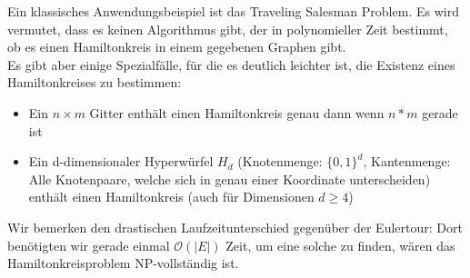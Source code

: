 \documentclass[a4paper]{report}
\begin{document}
Ein klassisches Anwendungsbeispiel ist das Traveling Salesman Problem. Es wird vermutet, dass es keinen 
Algorithmus gibt, der in polynomieller Zeit bestimmt, ob es einen Hamiltonkreis in einem gegebenen Graphen 
gibt. \\

Es gibt aber einige Spezialfälle, für die es deutlich leichter ist, die Existenz eines Hamiltonkreises 
zu bestimmen:

\begin{itemize}
    \item Ein $n \times m$ Gitter enthält einen Hamiltonkreis genau dann wenn $n * m$ gerade ist
    \item Ein d-dimensionaler Hyperwürfel $H_d$ (Knotenmenge: $\{0, 1\}^d$, Kantenmenge: Alle Knotenpaare, welche sich in genau einer Koordinate unterscheiden) enthält einen Hamiltonkreis (auch für Dimensionen $d \geq 4$)
\end{itemize}





Wir bemerken den drastischen Laufzeitunterschied gegenüber der Eulertour: Dort benötigten wir gerade 
einmal $\mathcal{O}(|E|)$ Zeit, um eine solche zu finden, wären das Hamiltonkreisproblem NP-vollständig ist.
\end{document}
